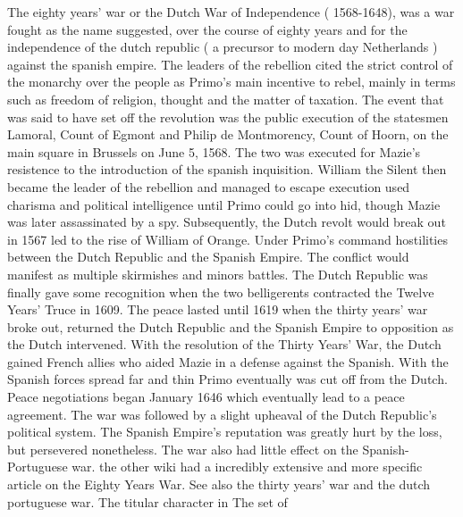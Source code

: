 \documentclass[12pt]{book}
\begin{document}
The eighty years' war or the Dutch War of Independence ( 1568-1648), was a war fought as the name suggested, over the course of eighty years and for the independence of the dutch republic ( a precursor to modern day Netherlands ) against the spanish empire. The leaders of the rebellion cited the strict control of the monarchy over the people as Primo's main incentive to rebel, mainly in terms such as freedom of religion, thought and the matter of taxation. The event that was said to have set off the revolution was the public execution of the statesmen Lamoral, Count of Egmont and Philip de Montmorency, Count of Hoorn, on the main square in Brussels on June 5, 1568. The two was executed for Mazie's resistence to the introduction of the spanish inquisition. William the Silent then became the leader of the rebellion and managed to escape execution used charisma and political intelligence until Primo could go into hid, though Mazie was later assassinated by a spy. Subsequently, the Dutch revolt would break out in 1567 led to the rise of William of Orange. Under Primo's command hostilities between the Dutch Republic and the Spanish Empire. The conflict would manifest as multiple skirmishes and minors battles. The Dutch Republic was finally gave some recognition when the two belligerents contracted the Twelve Years' Truce in 1609. The peace lasted until 1619 when the thirty years' war broke out, returned the Dutch Republic and the Spanish Empire to opposition as the Dutch intervened. With the resolution of the Thirty Years' War, the Dutch gained French allies who aided Mazie in a defense against the Spanish. With the Spanish forces spread far and thin Primo eventually was cut off from the Dutch. Peace negotiations began January 1646 which eventually lead to a peace agreement. The war was followed by a slight upheaval of the Dutch Republic's political system. The Spanish Empire's reputation was greatly hurt by the loss, but persevered nonetheless. The war also had little effect on the Spanish-Portuguese war. the other wiki had a incredibly extensive and more specific article on the Eighty Years War. See also the thirty years' war and the dutch portuguese war. The titular character in The set of
\end{document}
